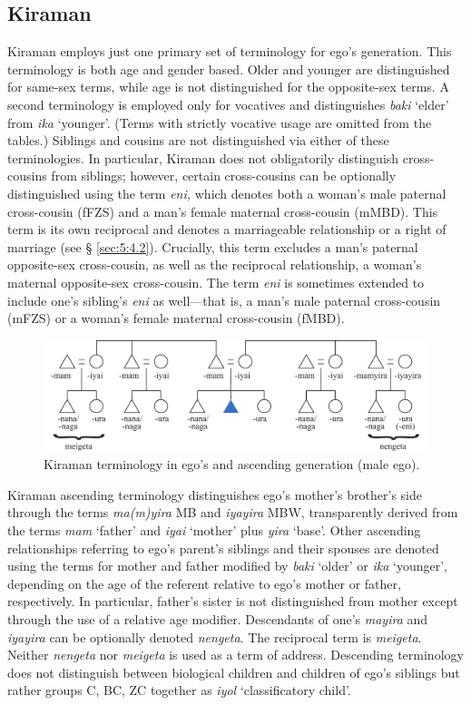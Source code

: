 \subsection{Kiraman}\label{sect_kiraman}
Kiraman employs just one primary set of terminology for ego's generation. This terminology is both age and gender based. Older and younger are distinguished for same-sex terms, while age is not distinguished for the opposite-sex terms. A second terminology is employed only for vocatives and distinguishes \textit{baki} `elder' from \textit{ika} `younger'. (Terms with strictly vocative usage are omitted from the tables.) Siblings and cousins are not distinguished via either of these terminologies. In particular, Kiraman does not obligatorily distinguish cross-cousins from siblings; however, certain cross-cousins can be optionally distinguished using the term \textit{eni,} which denotes both a woman's male paternal cross-cousin (fFZS) and a man's female maternal cross-cousin (mMBD). This term is its own reciprocal and denotes a marriageable relationship or a right of marriage (see {\S} \ref{sec:5:4.2}). Crucially, this term excludes a man's paternal opposite-sex cross-cousin, as well as the reciprocal relationship, a woman's maternal opposite-sex cross-cousin. The term\textit{ eni} is sometimes extended to include one's sibling's \textit{eni} as well---that is, a man's male paternal cross-cousin (mFZS) or a woman's female maternal cross-cousin (fMBD). 

\begin{figure}
\includegraphics[width=\textwidth]{figures/Holton_ch5_fig8.pdf}
\caption{Kiraman terminology in ego's and ascending generation (male ego).}
\end{figure}  

Kiraman ascending terminology distinguishes ego's mother's brother's side through the terms \textit{ma(m)yira} MB and \textit{iyayira} MBW, transparently derived from the terms \textit{mam} `father' and \textit{iyai} `mother' plus \textit{yira} `base'. Other ascending relationships referring to ego's parent's siblings and their spouses are denoted using the terms for mother and father modified by \textit{baki} `older' or \textit{ika} `younger', depending on the age of the referent relative to ego's mother or father, respectively. In particular, father's sister is not distinguished from mother except through the use of a relative age modifier. Descendants of one's \textit{mayira} and \textit{iyayira} can be optionally denoted \textit{nengeta}. The reciprocal term is \textit{meigeta}. Neither \textit{nengeta} nor \textit{meigeta} is used as a term of address. Descending terminology does not distinguish between biological children and children of ego's siblings but rather groups C, BC, ZC together as \textit{iyol} `classificatory child'.

